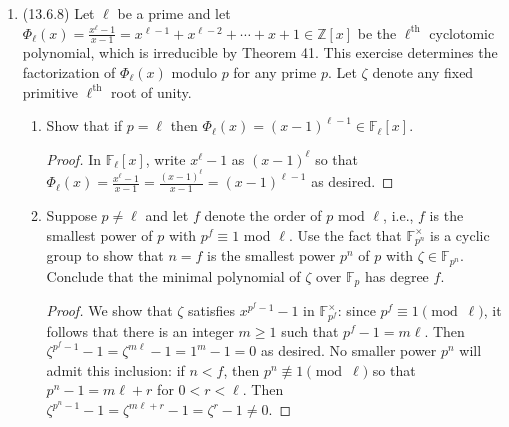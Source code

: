 \documentclass[11pt]{article}
\begin{document}
\begin{enumerate}
\begin{proof}
        Claim: $\zeta_2\zeta_n = -\zeta_n$ is a common root: Clearly it is a root of $\varPhi_n(-x)$, but to see that it is a root of $\varPhi_{2n}(x)$ we show that $-\zeta_n$ has order $2n$ in the group of $2n$-th roots of unity. Observe that $(-\zeta_n)^{2n} = \zeta_n^{2n} = 1$ so that the order of $-\zeta_n$ divides $2n$. But the order of $-1$ is $2$ and the order of $\zeta_n$ is $n$, and since $\gcd(2,n)=1$ it follows that the order of their product cannot be any lower than $2n$; that is, it must be exactly $2n$ as desired. Hence $-\zeta_n$ is a common root of the above two minimal polynomials so they must be equivalent.
    \end{proof}
    \item (13.6.8) Let $\ell$ be a prime and let $\varPhi_\ell(x) = \frac{x^\ell-1}{x-1} = x^{\ell-1} + x^{\ell-2} + \cdots + x + 1\in \mathbb{Z}[x]$ be the $\ell^\text{th}$ cyclotomic polynomial, which is irreducible by Theorem 41. This exercise determines the factorization of $\varPhi_\ell(x)$ modulo $p$ for any prime $p$. Let $\zeta$ denote any fixed primitive $\ell^\text{th}$ root of unity. \begin{enumerate}
        \item Show that if $p = \ell$ then $\varPhi_\ell(x) = (x-1)^{\ell-1}\in \mathbb{F}_\ell[x]$. \begin{proof}
            In $\mathbb{F}_\ell[x]$, write $x^\ell-1$ as $(x-1)^\ell$ so that $\varPhi_\ell(x) = \frac{x^\ell-1}{x-1} = \frac{(x-1)^\ell}{x-1} = (x-1)^{\ell-1}$ as desired.
        \end{proof}
        \item Suppose $p\neq \ell$ and let $f$ denote the order of $p$ mod $\ell$, i.e., $f$ is the smallest power of $p$ with $p^f \equiv 1 $ mod $\ell$. Use the fact that $\mathbb{F}_{p^n}^\times$ is a cyclic group to show that $n = f$ is the smallest power $p^n$ of $p$ with $\zeta \in \mathbb{F}_{p^n}$. Conclude that the minimal polynomial of $\zeta$ over $\mathbb{F}_p$ has degree $f$. \begin{proof}
            We show that $\zeta$ satisfies $x^{p^f-1}-1$ in $\mathbb{F}_{p^f}^\times$: since $p^f\equiv 1\pmod \ell$, it follows that there is an integer $m\geq 1$ such that $p^f-1 = m\ell$. Then $\zeta^{p^f-1}-1 = \zeta^{m\ell}-1 = 1^m-1 = 0$ as desired. No smaller power $p^n$ will admit this inclusion: if $n<f$, then $p^n\not\equiv 1\pmod \ell$ so that $p^n-1 = m\ell + r$ for $0<r < \ell$. Then $\zeta^{p^n-1}-1 = \zeta^{m\ell+r}-1 = \zeta^r-1\neq 0$.


\end{proof}
\end{enumerate}
\end{enumerate}
\end{document}

